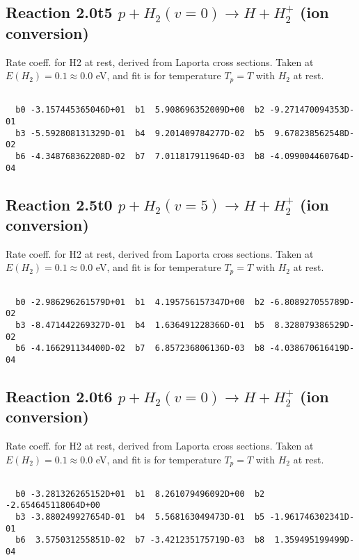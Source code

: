 \documentclass[12pt,dvipdfmx]{article}
\begin{document}
\newpage
\subsection{
Reaction 2.0t5
$ p + H_2(v=0) \rightarrow H + H_2^+$ (ion conversion)
}
Rate coeff. for H2 at rest, derived from Laporta cross sections.
Taken at $E(H_2) = 0.1 \approx 0.0$ eV,  and fit is for temperature $T_p=T$ with $H_2$ at rest.

\begin{small}\begin{verbatim}

  b0 -3.157445365046D+01  b1  5.908696352009D+00  b2 -9.271470094353D-01
  b3 -5.592808131329D-01  b4  9.201409784277D-02  b5  9.678238562548D-02
  b6 -4.348768362208D-02  b7  7.011817911964D-03  b8 -4.099004460764D-04

\end{verbatim}\end{small}

\newpage
\subsection{
Reaction 2.5t0
$ p + H_2(v=5) \rightarrow H + H_2^+$ (ion conversion)
}
Rate coeff. for H2 at rest, derived from Laporta cross sections.
Taken at $E(H_2) = 0.1 \approx 0.0$ eV,  and fit is for temperature $T_p=T$ with $H_2$ at rest.

\begin{small}\begin{verbatim}

  b0 -2.986296261579D+01  b1  4.195756157347D+00  b2 -6.808927055789D-02
  b3 -8.471442269327D-01  b4  1.636491228366D-01  b5  8.328079386529D-02
  b6 -4.166291134400D-02  b7  6.857236806136D-03  b8 -4.038670616419D-04

\end{verbatim}\end{small}

\newpage
\subsection{
Reaction 2.0t6
$ p + H_2(v=0) \rightarrow H + H_2^+$ (ion conversion)
}
Rate coeff. for H2 at rest, derived from Laporta cross sections.
Taken at $E(H_2) = 0.1 \approx 0.0$ eV,  and fit is for temperature $T_p=T$ with $H_2$ at rest.

\begin{small}\begin{verbatim}

  b0 -3.281326265152D+01  b1  8.261079496092D+00  b2 -2.654645118064D+00
  b3 -3.880249927654D-01  b4  5.568163049473D-01  b5 -1.961746302341D-01
  b6  3.575031255851D-02  b7 -3.421235175719D-03  b8  1.359495199499D-04

\end{verbatim}\end{small}
\end{document}
